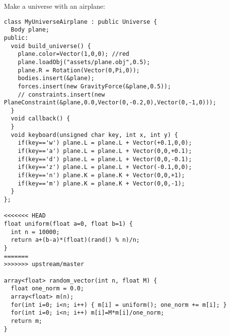 \noindent
Make a universe with an airplane: \begin{lstlisting}
class MyUniverseAirplane : public Universe {
  Body plane;
public:
  void build_universe() {
    plane.color=Vector(1,0,0); //red
    plane.loadObj("assets/plane.obj",0.5);    
    plane.R = Rotation(Vector(0,Pi,0));
    bodies.insert(&plane);    
    forces.insert(new GravityForce(&plane,0.5));
    // constraints.insert(new PlaneConstraint(&plane,0.0,Vector(0,-0.2,0),Vector(0,-1,0)));
  }
  void callback() {
  }
  void keyboard(unsigned char key, int x, int y) {
    if(key=='w') plane.L = plane.L + Vector(+0.1,0,0);
    if(key=='a') plane.L = plane.L + Vector(0,0,+0.1);
    if(key=='d') plane.L = plane.L + Vector(0,0,-0.1);
    if(key=='z') plane.L = plane.L + Vector(-0.1,0,0);
    if(key=='n') plane.K = plane.K + Vector(0,0,+1);
    if(key=='m') plane.K = plane.K + Vector(0,0,-1);    
  }
};

<<<<<<< HEAD
float uniform(float a=0, float b=1) {
  int n = 10000;
  return a+(b-a)*(float)(rand() % n)/n;
}
=======
>>>>>>> upstream/master

array<float> random_vector(int n, float M) {
  float one_norm = 0.0;
  array<float> m(n);
  for(int i=0; i<n; i++) { m[i] = uniform(); one_norm += m[i]; }
  for(int i=0; i<n; i++) m[i]=M*m[i]/one_norm;
  return m;
}
\end{lstlisting}
\noindent
